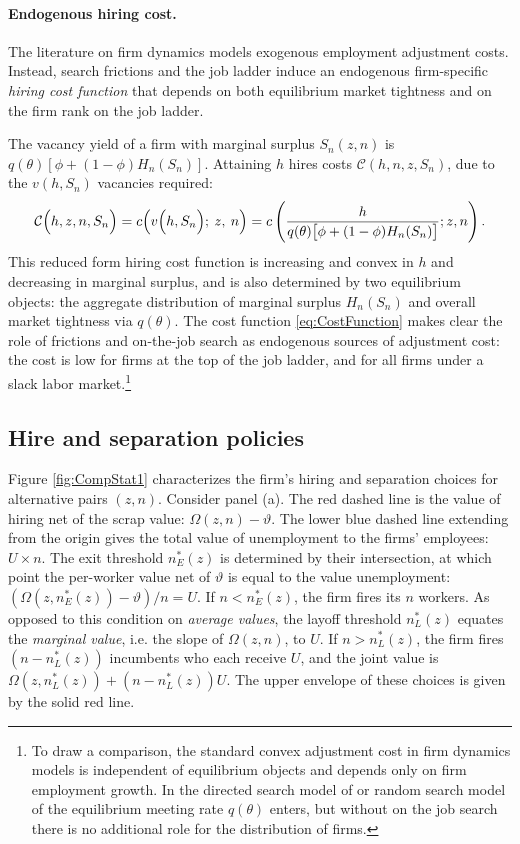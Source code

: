 \paragraph{Endogenous hiring cost.}
The literature on firm dynamics models exogenous employment adjustment costs.
Instead, search frictions and the job ladder induce an endogenous firm-specific \emph{hiring cost function} that depends on both equilibrium market tightness and on the firm rank on the job ladder.

The vacancy yield of a firm with marginal surplus $S_n(z,n)$ is $q(\theta)[\phi+(1-\phi)H_n(S_n)]$.
Attaining ${h}$ hires costs $\mathcal{C}({h},n,z,S_n)$, due to the ${v}(h,S_n)$ vacancies required:
\vspace*{-.3cm}\begin{equation}\label{eq:CostFunction}
\mathcal{C}\Big({h},z,n,S_n\Big) = c\Big(v\Big({h},S_n\Big);\:z,\:n\Big)
= c\left(\frac{{h}}{q(\theta)\big[\phi + (1-\phi)H_n(S_n)\big]};z,n\right).
\vspace*{-.3cm}\end{equation}
This reduced form hiring cost function is increasing and convex in ${h}$ and decreasing in marginal surplus, and
is also determined by two equilibrium objects: the aggregate distribution of marginal surplus $H_n(S_n)$ and overall market tightness via $q(\theta)$.
The cost function \eqref{eq:CostFunction} makes clear the role of frictions and on-the-job search as endogenous sources of adjustment cost: the cost is low for firms at the top of the job ladder, and for all firms under a slack labor market.\footnote{%
    To draw a comparison, the standard convex adjustment cost in firm dynamics models is independent of equilibrium objects and depends only on firm employment growth.
    In the directed search model of \citet{KassKircher} or random search model of \citet{Gavazza2018} the equilibrium meeting rate $q(\theta)$ enters, but without on the job search there
    is no additional role for the distribution of firms.}

\subsection{Hire and separation policies}

Figure \ref{fig:CompStat1} characterizes the firm's hiring and separation choices for alternative pairs $(z,n)$.
Consider panel (a).
The red dashed line is the value of hiring net of the scrap value: $\Omega(z,n)-\vartheta$.
The lower blue dashed line extending from the origin gives the total value of unemployment to the firms' employees: $U\times n$.
The exit threshold $n^\ast_E(z)$ is determined by their intersection, at which point the per-worker value net of $\vartheta$ is equal to the value unemployment: $\left(\Omega(z,n^\ast_E(z))-\vartheta\right)/n=U$.
If $n<n^\ast_E(z)$, the firm fires its $n$ workers.
As opposed to this condition on \emph{average values}, the layoff threshold $n^\ast_L(z)$ equates the \emph{marginal value}, i.e. the slope of $\Omega(z,n)$, to $U$.
If $n>n^\ast_L(z)$, the firm fires $\left(n-n^\ast_L(z)\right)$ incumbents who each receive $U$, and the joint value is $\Omega(z,n^\ast_L(z)) + \left(n-n^\ast_L(z)\right)U$.
The upper envelope of these choices is given by the solid red line.

